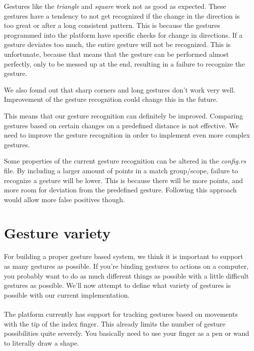 \documentclass[a4paper]{article}
\begin{document}
  Gestures like the \textit{triangle} and \textit{square} work not as good as
  expected. These gestures have a tendency to not get recognized if the change
  in the direction is too great or after a long consistent pattern. This is
  because the gestures programmed into the platform have specific checks for
  change in directions. If a gesture deviates too much, the entire gesture will
  not be recognized. This is unfortunate, because that means that the gesture
  can be performed almost perfectly, only to be messed up at the end, resulting
  in a failure to recognize the gesture.

  We also found out that sharp corners and long gestures don't work very well.
  Improvement of the gesture recognition could change this in the future.

  This means that our gesture recognition can definitely be improved. Comparing
  gestures based on certain changes on a predefined distance is not effective.
  We need to improve the gesture recognition in order to implement even more
  complex gestures.

  Some properties of the current gesture recognition can be altered in the \textit{config.rs}
  file. By including a larger amount of points in a match group/scope, failure to recognize a
  gesture will be lower. This is because there will be more points, and more
  room for deviation from the predefined gesture. Following this approach would
  allow more false positives though.

  \clearpage

  \section*{Gesture variety}
  For building a proper gesture based system, we think it is important to
  support as many gestures as possible. If you're binding gestures to actions on
  a computer, you probably want to do as much different things as possible with
  a little difficult gestures as possible. We'll now attempt to define what
  variety of gestures is possible with our current implementation.

  \paragraph{}
  The platform currently has support for tracking gestures based on movements
  with the tip of the index finger. This already limits the number of gesture
  possibilities quite severely. You basically need to use your finger as a pen
  or wand to literally draw a shape.
\end{document}
